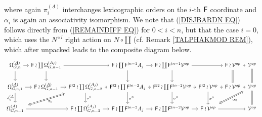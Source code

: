 \documentclass[a4paper,10pt]{article}%
\begin{document}
where again $\pi_i^{(\underline{A})}$ interchanges lexicographic orders on the $i$-th $\mathsf{F}$ coordinate and $\alpha_i$ is again an associativity isomorphism.
We note that (\ref{DISJBARDN EQ}) follows directly from 
(\ref{REMAINDIFF EQ}) for $0<i<n$, but that the case $i=0$, which uses the $N^{\times l}$ right action on $N \circ \amalg$ (cf. Remark \ref{TALPHAKMOD REM}), which after unpacked leads to the composite diagram below.
\begin{equation}\label{ASSOCSPANJ1 EQ}
	\begin{tikzcd}[column sep=0.5em]
	\Omega_{G,n}^{(\underline{A})}  \ar{d} \ar{r} &
	\Fin \wr \coprod \Omega_{G,n-1}^{(A_j)} \ar{d} \ar{rr} &&
	\Fin \wr \coprod \Fin^{\wr n-1} A_j \ar{d} \ar{r}&
	\Fin \wr \coprod \Fin^{\wr n-1} \mathcal{V}^{op} \ar{d}\ar{rr} & &
	|[alias=cat3]|
	\Fin \wr \mathcal{V}^{op} \ar[equal]{d} \ar{r} &
	\mathcal{V}^{op} \ar[equal]{d}
\\
	\Omega_{G,n,1}^{(\underline{A})} \ar{r} \ar{d}[swap]{d_0^{(\underline{A}}} &
	|[alias=cat2]|
	\Fin \wr \Omega_{G,n-1}^{(\underline{A})} \ar{r} &
	|[alias=FFOmega]| \Fin^{\wr 2} \wr \coprod \Omega_{G,n-2}^{(A_j)} \ar{d}{\sigma^0} \ar{r} &
	\Fin^{\wr 2} \wr \coprod \Fin^{\wr n-2} A_j \ar{d}{\sigma^0} \ar{r} &
	\Fin^{\wr 2} \wr \coprod \Fin^{\wr n-2} \mathcal{V}^{op} \ar{d}{\sigma^0} \ar{r}&
	|[alias=dog3]|
	\Fin^{\wr 2} \wr \mathcal{V}^{op} \ar{d}{\sigma^0} \ar{r} &
	\Fin \wr \mathcal{V}^{op} \ar{r} &
	|[alias=dog]|
	\mathcal{V}^{op} \ar[equal]{d}
\\
	|[alias=Omega]|\Omega_{G,n-1}^{(\underline{A})} \ar{rr} &&
	\Fin \wr \coprod \Omega_{G,n-2}^{(A_j)} \ar{r} &
	\Fin \wr \coprod \Fin^{\wr n-2} A_j \ar{r} &
	\Fin \wr \coprod \Fin^{\wr n-2} \mathcal{V}^{op} \ar{r}&
	|[alias=cat]|
	\Fin \wr \mathcal{V}^{op} \ar{rr} &&
	\mathcal{V}^{op}
	\arrow[Leftrightarrow, from=FFOmega, to=Omega,shorten <=0.15cm,shorten >=0.15cm,"\pi_0"]
	\arrow[Leftrightarrow, from=dog, to=cat,shorten <=0.15cm,shorten >=0.15cm,"\alpha_0"]
	\end{tikzcd}
\end{equation}
\end{document}

